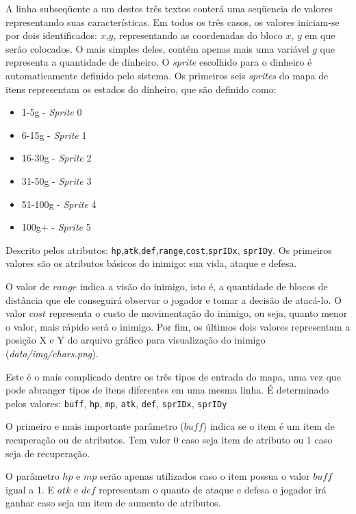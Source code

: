 A linha subseqüente a um destes três textos conterá uma seqüencia de valores representando suas características. Em todos os três casos, os valores iniciam-se por dois identificados: $x$,$y$, representando as coordenadas do bloco $x$, $y$ em que serão colocados.
O mais simples deles, contém apenas mais uma variável $g$ que representa a quantidade de dinheiro. O \textit{sprite} escolhido para o dinheiro é automaticamente
definido pelo sistema. Os primeiros seis \textit{sprites} do mapa de itens representam os estados do dinheiro, que são definido como:
\begin{itemize}
	
	\item 1-5g -    \textit{Sprite} 0
	\item 6-15g -   \textit{Sprite} 1
	\item 16-30g -  \textit{Sprite} 2
	\item 31-50g -  \textit{Sprite} 3
	\item 51-100g - \textit{Sprite} 4
	\item 100g+ -   \textit{Sprite} 5
\end{itemize}

Descrito pelos atributos: \texttt{hp},\texttt{atk},\texttt{def},\texttt{range},\texttt{cost},\texttt{sprIDx}, \texttt{sprIDy}.
Os primeiros valores são os atributos básicos do inimigo: sua vida, ataque e defesa.

O valor de $range$ indica a visão do inimigo, isto é, a quantidade de blocos de distância que ele conseguirá observar o jogador e tomar a decisão de atacá-lo.
O valor $cost$ representa o custo de movimentação do inimigo, ou seja, quanto menor o valor, mais rápido será o inimigo.
Por fim, os últimos dois valores representam a posição X e Y do arquivo gráfico para visualização do inimigo (\textit{data/img/chars.png}).

Este é o mais complicado dentre os três tipos de entrada do mapa, uma vez que pode abranger tipos de itens diferentes em uma mesma linha.
É determinado pelos valores: \texttt{buff}, \texttt{hp}, \texttt{mp}, \texttt{atk}, \texttt{def}, \texttt{sprIDx}, \texttt{sprIDy}

O primeiro e mais importante parâmetro ($buff$) indica se o item é um item de recuperação ou de atributos. Tem valor 0 caso seja item de atributo ou 1 caso seja de recuperação.

O parâmetro $hp$ e $mp$ serão apenas utilizados caso o item possua o valor $buff$ igual a 1. E $atk$ e $def$ representam o quanto de ataque e defesa o jogador irá ganhar caso seja um item de aumento de atributos. 

